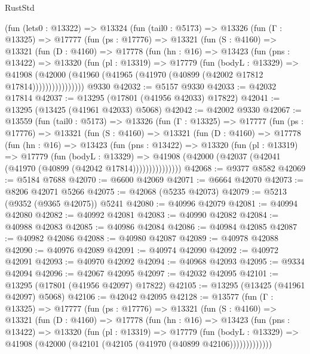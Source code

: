 \begin{lexlean}{RustStd}
\begin{coremodule}
    (fun (lets0 : @13322) =>
    @13324
      (fun (tail0 : @5173) =>
      @13326
        (fun (Γ : @13325) =>
        @17777
          (fun (ps : @17776) =>
          @13321
            (fun (S : @4160) =>
            @13321
              (fun (D : @4160) =>
              @17778
                (fun (hn : @16) =>
                @13423
                  (fun (pns : @13422) =>
                  @13320
                    (fun (pl : @13319) =>
                    @17779
                      (fun (bodyL : @13329) =>
                      @41908
                        (@42000
                          (@41960 (@41965 (@41970 (@40899 (@42002 @17812 @17814))))))))))))))))
    @9330
@42032 := @5157 @9330
@42033 := @42032 @17814
@42037 := @13295 (@17801 (@41956 @42033) @17822)
@42041 := @13295 (@13425 (@41961 @42033) @5068)
@42042 := @42002 @9330
@42067 := @13559
    (fun (tail0 : @5173) =>
    @13326
      (fun (Γ : @13325) =>
      @17777
        (fun (ps : @17776) =>
        @13321
          (fun (S : @4160) =>
          @13321
            (fun (D : @4160) =>
            @17778
              (fun (hn : @16) =>
              @13423
                (fun (pns : @13422) =>
                @13320
                  (fun (pl : @13319) =>
                  @17779
                    (fun (bodyL : @13329) =>
                    @41908 (@42000 (@42037 (@42041 (@41970 (@40899 (@42042 @17814)))))))))))))))
@42068 := @9377 @8582
@42069 := @5184 @7688
@42070 := @6600 @42069
@42071 := @6664 @42070
@42073 := @8206 @42071 @5266
@42075 := @42068 (@5235 @42073)
@42079 := @5213 (@9352 (@9365 @42075)) @5241
@42080 := @40996 @42079
@42081 := @40994 @42080
@42082 := @40992 @42081
@42083 := @40990 @42082
@42084 := @40988 @42083
@42085 := @40986 @42084
@42086 := @40984 @42085
@42087 := @40982 @42086
@42088 := @40980 @42087
@42089 := @40978 @42088
@42090 := @40976 @42089
@42091 := @40974 @42090
@42092 := @40972 @42091
@42093 := @40970 @42092
@42094 := @40968 @42093
@42095 := @9334 @42094
@42096 := @42067 @42095
@42097 := @42032 @42095
@42101 := @13295 (@17801 (@41956 @42097) @17822)
@42105 := @13295 (@13425 (@41961 @42097) @5068)
@42106 := @42042 @42095
@42128 := @13577
    (fun (Γ : @13325) =>
    @17777
      (fun (ps : @17776) =>
      @13321
        (fun (S : @4160) =>
        @13321
          (fun (D : @4160) =>
          @17778
            (fun (hn : @16) =>
            @13423
              (fun (pns : @13422) =>
              @13320
                (fun (pl : @13319) =>
                @17779
                  (fun (bodyL : @13329) =>
                  @41908 (@42000 (@42101 (@42105 (@41970 (@40899 @42106)))))))))))))

\end{coremodule}
\end{lexlean}
